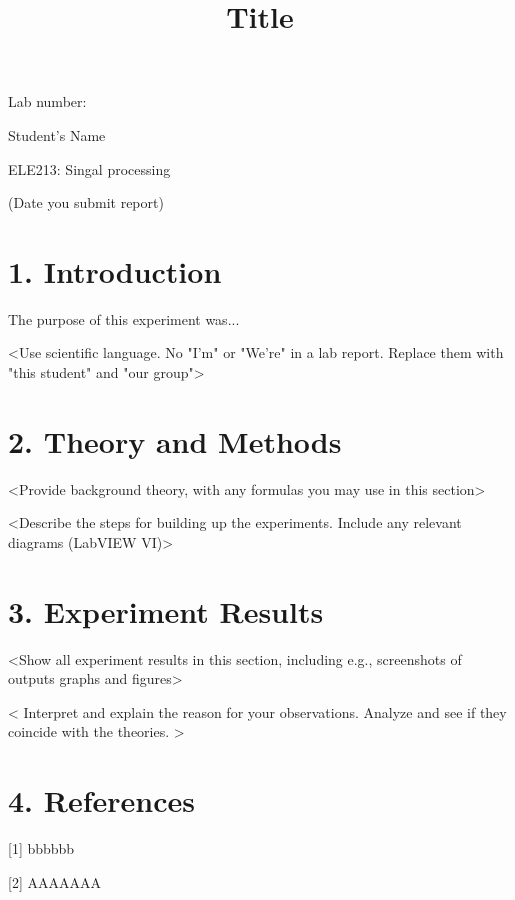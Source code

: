 \documentclass[10pt]{article}
\title{Title }
\author{}
\date{}
\begin{document}
\maketitle
Lab number:

Student's Name

ELE213: Singal processing

(Date you submit report)

\section*{1. Introduction}
The purpose of this experiment was...

<Use scientific language. No "I'm" or "We're" in a lab report. Replace them with "this student" and "our group">

\section*{2. Theory and Methods}
<Provide background theory, with any formulas you may use in this section>

<Describe the steps for building up the experiments. Include any relevant diagrams (LabVIEW VI)>

\section*{3. Experiment Results}
<Show all experiment results in this section, including e.g., screenshots of outputs graphs and figures>

< Interpret and explain the reason for your observations. Analyze and see if they coincide with the theories. >

\section*{4. References}
[1] bbbbbb

[2] AAAAAAA
\end{document}
